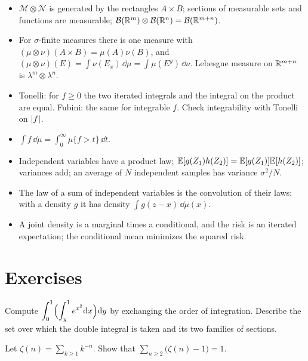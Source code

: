 \begin{notechapter}
\begin{chaptersummary}
\begin{itemize}[nosep]
  \item $\mathcal M\otimes\mathcal N$ is generated by the rectangles
        $A\times B$; sections of measurable sets and functions are
        measurable; $\mathcal B(\mathbb{R}^m)\otimes\mathcal B(\mathbb{R}^n)
        = \mathcal B(\mathbb{R}^{m+n})$.
  \item For $\sigma$-finite measures there is one measure with
        $(\mu\otimes\nu)(A\times B) = \mu(A)\nu(B)$, and
        $(\mu\otimes\nu)(E) = \int\nu(E_x)\,\dd\mu = \int\mu(E^y)\,\dd\nu$.
        Lebesgue measure on $\mathbb{R}^{m+n}$ is
        $\lambda^m\otimes\lambda^n$.
  \item Tonelli: for $f\geq0$ the two iterated integrals and the
        integral on the product are equal. Fubini: the same for
        integrable $f$. Check integrability with Tonelli on $\left|f\right|$.
  \item $\int f\,\dd\mu = \int_0^\infty\mu\{f > t\}\,\dd t$.
  \item Independent variables have a product law;
        $\mathbb{E}[g(Z_1)h(Z_2)] = \mathbb{E}[g(Z_1)]\mathbb{E}[h(Z_2)]$; variances add; an
        average of $N$ independent samples has variance $\sigma^2/N$.
  \item The law of a sum of independent variables is the convolution of
        their laws; with a density $g$ it has density
        $\int g(z - x)\,\dd\mu(x)$.
  \item A joint density is a marginal times a conditional, and the risk
        is an iterated expectation; the conditional mean minimizes the
        squared risk.
\end{itemize}
\end{chaptersummary}

\section*{Exercises}

\begin{exercise}\label{fubini:exr:1}
Compute
$\displaystyle\int_0^1\Bigl(\int_y^1e^{x^2}\mathrm{d} x\Bigr)\mathrm{d} y$
by exchanging the order of integration. Describe the set over which the
double integral is taken and its two families of sections.
\end{exercise}

\begin{exercise}\label{fubini:exr:2}
Let $\zeta(n) = \sum_{k\geq1}k^{-n}$. Show that
$\sum_{n\geq2}\bigl(\zeta(n) - 1\bigr) = 1$.
\end{exercise}


\end{notechapter}
